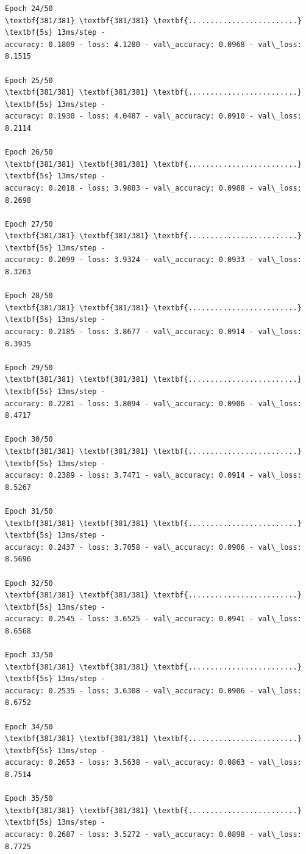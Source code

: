 \documentclass[11pt]{article}
\begin{document}
\begin{tcolorbox}[breakable, size=fbox, boxrule=1pt, pad at break*=1mm,colback=cellbackground, colframe=cellborder]
\begin{Verbatim}[commandchars=\\\{\}]
Epoch 24/50
\textbf{381/381} \textbf{381/381} \textbf{.........................} \textbf{5s} 13ms/step -
accuracy: 0.1809 - loss: 4.1280 - val\_accuracy: 0.0968 - val\_loss: 8.1515

Epoch 25/50
\textbf{381/381} \textbf{381/381} \textbf{.........................} \textbf{5s} 13ms/step -
accuracy: 0.1930 - loss: 4.0487 - val\_accuracy: 0.0910 - val\_loss: 8.2114

Epoch 26/50
\textbf{381/381} \textbf{381/381} \textbf{.........................} \textbf{5s} 13ms/step -
accuracy: 0.2018 - loss: 3.9883 - val\_accuracy: 0.0988 - val\_loss: 8.2698

Epoch 27/50
\textbf{381/381} \textbf{381/381} \textbf{.........................} \textbf{5s} 13ms/step -
accuracy: 0.2099 - loss: 3.9324 - val\_accuracy: 0.0933 - val\_loss: 8.3263

Epoch 28/50
\textbf{381/381} \textbf{381/381} \textbf{.........................} \textbf{5s} 13ms/step -
accuracy: 0.2185 - loss: 3.8677 - val\_accuracy: 0.0914 - val\_loss: 8.3935

Epoch 29/50
\textbf{381/381} \textbf{381/381} \textbf{.........................} \textbf{5s} 13ms/step -
accuracy: 0.2281 - loss: 3.8094 - val\_accuracy: 0.0906 - val\_loss: 8.4717

Epoch 30/50
\textbf{381/381} \textbf{381/381} \textbf{.........................} \textbf{5s} 13ms/step -
accuracy: 0.2389 - loss: 3.7471 - val\_accuracy: 0.0914 - val\_loss: 8.5267

Epoch 31/50
\textbf{381/381} \textbf{381/381} \textbf{.........................} \textbf{5s} 13ms/step -
accuracy: 0.2437 - loss: 3.7058 - val\_accuracy: 0.0906 - val\_loss: 8.5696

Epoch 32/50
\textbf{381/381} \textbf{381/381} \textbf{.........................} \textbf{5s} 13ms/step -
accuracy: 0.2545 - loss: 3.6525 - val\_accuracy: 0.0941 - val\_loss: 8.6568

Epoch 33/50
\textbf{381/381} \textbf{381/381} \textbf{.........................} \textbf{5s} 13ms/step -
accuracy: 0.2535 - loss: 3.6308 - val\_accuracy: 0.0906 - val\_loss: 8.6752

Epoch 34/50
\textbf{381/381} \textbf{381/381} \textbf{.........................} \textbf{5s} 13ms/step -
accuracy: 0.2653 - loss: 3.5638 - val\_accuracy: 0.0863 - val\_loss: 8.7514

Epoch 35/50
\textbf{381/381} \textbf{381/381} \textbf{.........................} \textbf{5s} 13ms/step -
accuracy: 0.2687 - loss: 3.5272 - val\_accuracy: 0.0898 - val\_loss: 8.7725


\end{Verbatim}
\end{tcolorbox}
\end{document}

